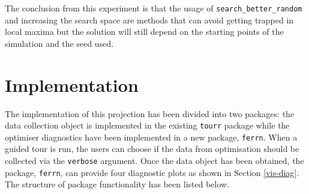 The conclusion from this experiment is that the usage of \texttt{search\_better\_random} and increasing the search space are methods that can avoid getting trapped in local maxima but the solution will still depend on the starting points of the simulation and the seed used.

\hypertarget{implementation}{%
\section{Implementation}\label{implementation}}

The implementation of this projection has been divided into two packages: the data collection object is implemented in the existing \texttt{tourr} package while the optimiser diagnostics have been implemented in a new package, \texttt{ferrn}. When a guided tour is run, the users can choose if the data from optimisation should be collected via the \texttt{verbose} argument. Once the data object has been obtained, the package, \texttt{ferrn}, can provide four diagnostic plots as shown in Section \ref{vis-diag}. The structure of package functionality has been listed below.

